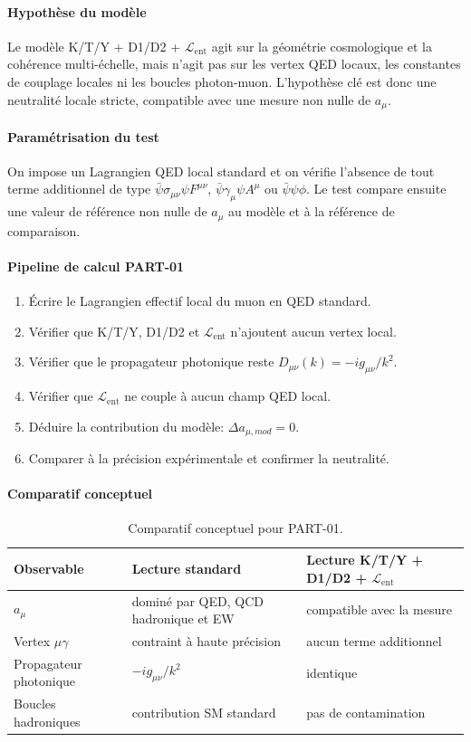 \documentclass[11pt,a4paper]{article}
\newcommand{\Lent}{\mathcal{L}_{\mathrm{ent}}}
\begin{document}
\paragraph{Hypothèse du modèle}
Le modèle K/T/Y + D1/D2 + $\Lent$ agit sur la géométrie cosmologique et la cohérence multi-échelle, mais n'agit pas sur les vertex QED locaux, les constantes de couplage locales ni les boucles photon-muon. L'hypothèse clé est donc une neutralité locale stricte, compatible avec une mesure non nulle de $a_\mu$.

\paragraph{Paramétrisation du test}
On impose un Lagrangien QED local standard et on vérifie l'absence de tout terme additionnel de type $\bar\psi\sigma_{\mu\nu}\psi F^{\mu\nu}$, $\bar\psi\gamma_{\mu}\psi A^{\mu}$ ou $\bar\psi\psi\phi$. Le test compare ensuite une valeur de référence non nulle de $a_\mu$ au modèle et à la référence de comparaison.

\paragraph{Pipeline de calcul PART-01}
\begin{enumerate}[leftmargin=*,itemsep=0.2em,topsep=0.2em]
\item Écrire le Lagrangien effectif local du muon en QED standard.
\item Vérifier que K/T/Y, D1/D2 et $\Lent$ n'ajoutent aucun vertex local.
\item Vérifier que le propagateur photonique reste $D_{\mu\nu}(k)=-ig_{\mu\nu}/k^2$.
\item Vérifier que $\Lent$ ne couple à aucun champ QED local.
\item Déduire la contribution du modèle: $\Delta a_{\mu,mod}=0$.
\item Comparer à la précision expérimentale et confirmer la neutralité.
\end{enumerate}

\paragraph{Comparatif conceptuel}
\begin{table}[htbp]
\centering
\begin{tabular}{>{\raggedright\arraybackslash}p{4cm} >{\raggedright\arraybackslash}p{5.2cm} >{\raggedright\arraybackslash}p{5.2cm}}
\toprule
Observable & Lecture standard & Lecture K/T/Y + D1/D2 + $\Lent$ \\
\midrule
$a_{\mu}$ & dominé par QED, QCD hadronique et EW & compatible avec la mesure \\
Vertex $\mu\gamma$ & contraint à haute précision & aucun terme additionnel \\
Propagateur photonique & $-ig_{\mu\nu}/k^2$ & identique \\
Boucles hadroniques & contribution SM standard & pas de contamination \\
\bottomrule
\end{tabular}
\caption{Comparatif conceptuel pour PART-01.}
\end{table}
\end{document}
